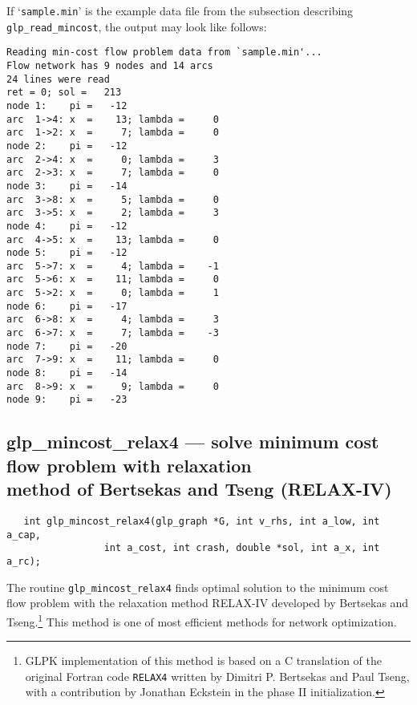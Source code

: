 \documentclass[11pt]{report}
\def\para#1{\noindent{\bf#1}}
\def\synopsis{\para{Synopsis}}
\def\description{\para{Description}}
\begin{document}
If `\verb|sample.min|' is the example data file from the subsection
describing \verb|glp_read_mincost|, the output may look like follows:

\begin{footnotesize}
\begin{verbatim}
Reading min-cost flow problem data from `sample.min'...
Flow network has 9 nodes and 14 arcs
24 lines were read
ret = 0; sol =   213
node 1:    pi =   -12
arc  1->4: x  =    13; lambda =     0
arc  1->2: x  =     7; lambda =     0
node 2:    pi =   -12
arc  2->4: x  =     0; lambda =     3
arc  2->3: x  =     7; lambda =     0
node 3:    pi =   -14
arc  3->8: x  =     5; lambda =     0
arc  3->5: x  =     2; lambda =     3
node 4:    pi =   -12
arc  4->5: x  =    13; lambda =     0
node 5:    pi =   -12
arc  5->7: x  =     4; lambda =    -1
arc  5->6: x  =    11; lambda =     0
arc  5->2: x  =     0; lambda =     1
node 6:    pi =   -17
arc  6->8: x  =     4; lambda =     3
arc  6->7: x  =     7; lambda =    -3
node 7:    pi =   -20
arc  7->9: x  =    11; lambda =     0
node 8:    pi =   -14
arc  8->9: x  =     9; lambda =     0
node 9:    pi =   -23
\end{verbatim}
\end{footnotesize}

\subsection{glp\_mincost\_relax4 --- solve minimum cost flow problem
with relaxation\\method of Bertsekas and Tseng (RELAX-IV)}

\synopsis

\begin{verbatim}
   int glp_mincost_relax4(glp_graph *G, int v_rhs, int a_low, int a_cap,
                 int a_cost, int crash, double *sol, int a_x, int a_rc);
\end{verbatim}

\description

The routine \verb|glp_mincost_relax4| finds optimal solution to the
minimum cost flow problem with the relaxation method RELAX-IV developed
by Bertsekas and Tseng.\footnote{GLPK implementation of this method is
based on a C translation of the original Fortran code {\tt RELAX4}
written by Dimitri P. Bertsekas and Paul Tseng, with a contribution by
Jonathan Eckstein in the phase II initialization.} This method is one
of most efficient methods for network optimization.
\end{document}
